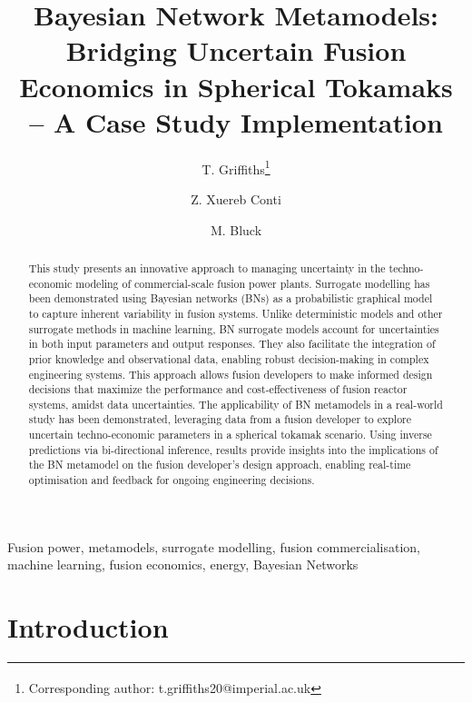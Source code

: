 \documentclass[journal]{IEEEtran}
\begin{document}
\title{Bayesian Network Metamodels: Bridging Uncertain Fusion Economics in Spherical Tokamaks -- A Case Study Implementation}

\author[1]{T. Griffiths\thanks{\textsuperscript{\Cross}Corresponding author: t.griffiths20@imperial.ac.uk}}
\author[2]{Z. Xuereb Conti}
\author[1]{M. Bluck}

\vspace{-15pt}

\maketitle

\begin{abstract}
This study presents an innovative approach to managing uncertainty in the techno-economic modeling of commercial-scale fusion power plants. Surrogate modelling has been demonstrated using Bayesian networks (BNs) as a probabilistic graphical model to capture inherent variability in fusion systems. Unlike deterministic models and other surrogate methods in machine learning, BN surrogate models account for uncertainties in both input parameters and output responses. They also facilitate the integration of prior knowledge and observational data, enabling robust decision-making in complex engineering systems. This approach allows fusion developers to make informed design decisions that maximize the performance and cost-effectiveness of fusion reactor systems, amidst data uncertainties. The applicability of BN metamodels in a real-world study has been demonstrated, leveraging data from a fusion developer to explore uncertain techno-economic parameters in a spherical tokamak scenario. Using inverse predictions via bi-directional inference, results provide insights into the implications of the BN metamodel on the fusion developer's design approach, enabling real-time optimisation and feedback for ongoing engineering decisions. 
\end{abstract}

\begin{IEEEkeywords}
Fusion power, metamodels, surrogate modelling, fusion commercialisation, machine learning, fusion economics, energy, Bayesian Networks
\end{IEEEkeywords}
\vspace{-2ex}

\section{Introduction}
\end{document}
